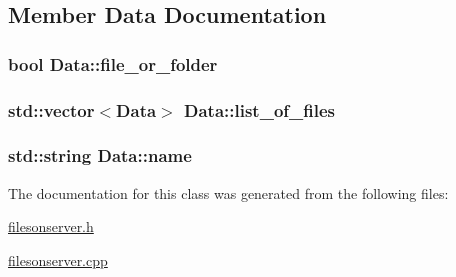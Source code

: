 \subsection{Member Data Documentation}
\hypertarget{classData_ae955079403d5eeb07994bb666faac1e6}{
\subsubsection[{file\-\_\-or\-\_\-folder}]{\setlength{\rightskip}{0pt plus 5cm}bool Data\-::file\-\_\-or\-\_\-folder\hspace{0.3cm}{\ttfamily [private]}}}\label{classData_ae955079403d5eeb07994bb666faac1e6}
\hypertarget{classData_a14e8995ae5e9f3384ba903abcd705ca0}{
\subsubsection[{list\-\_\-of\-\_\-files}]{\setlength{\rightskip}{0pt plus 5cm}std\-::vector$<${\bf Data}$>$ Data\-::list\-\_\-of\-\_\-files\hspace{0.3cm}{\ttfamily [private]}}}\label{classData_a14e8995ae5e9f3384ba903abcd705ca0}
\hypertarget{classData_a6286e2dc9a682048ddf557bc9126ea1b}{
\subsubsection[{name}]{\setlength{\rightskip}{0pt plus 5cm}std\-::string Data\-::name\hspace{0.3cm}{\ttfamily [private]}}}\label{classData_a6286e2dc9a682048ddf557bc9126ea1b}


The documentation for this class was generated from the following files\-:\begin{DoxyCompactItemize}
\item 
\hyperlink{filesonserver_8h}{filesonserver.\-h}\item 
\hyperlink{filesonserver_8cpp}{filesonserver.\-cpp}\end{DoxyCompactItemize}
